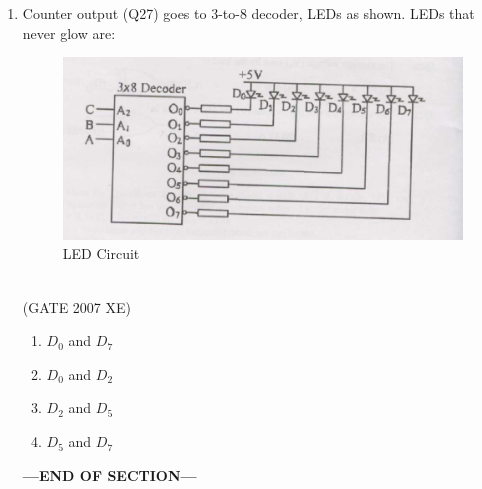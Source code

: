 \documentclass[journal,cmex10]{IEEEtran}
\theoremstyle{remark}
\numberwithin{equation}{enumi}
\numberwithin{figure}{enumi}
\begin{document}
\begin{enumerate}
    \item Counter output (Q27) goes to 3-to-8 decoder, LEDs as shown. LEDs that never glow are:
    \begin{figure}[htbp]
  \centering
  \includegraphics[width=0.7\columnwidth]{figs/C/fig15.png}
  \caption{LED Circuit}
  \label{fig:C/fig15.png}
\end{figure} \\
    \hfill{(GATE 2007 XE)}
    \begin{multicols}{4}
    \begin{enumerate}
        \item $D_0$ and $D_7$
        \item $D_0$ and $D_2$
        \item $D_2$ and $D_5$
        \item $D_5$ and $D_7$
    \end{enumerate}
    \end{multicols}

    \vspace{3\baselineskip}
    \begin{center}
    \textbf{\Large ---END OF SECTION---}
    \end{center}
\end{enumerate}

\newpage 

\end{document}
